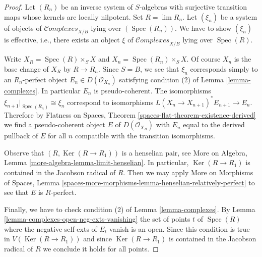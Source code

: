 \documentclass[10pt,a4paper]{amsart}
\theoremstyle{plain}
\theoremstyle{definition}
\theoremstyle{remark}
\numberwithin{equation}{subsection}
\def\lim{\mathop{\mathrm{lim}}\nolimits}
\def\Spec{\mathop{\mathrm{Spec}}}
\def\Ker{\mathop{\mathrm{Ker}}}
\def\Complexesstack{\mathcal{C}\!\mathit{omplexes}}
\begin{document}
\begin{proof}
Let $(R_n)$ be an inverse system of $S$-algebras with surjective transition
maps whose kernels are locally nilpotent. Set $R = \lim R_n$.
Let $(\xi_n)$ be a system of objects of $\Complexesstack_{X/B}$
lying over $(\Spec(R_n))$. We have to show $(\xi_n)$ is effective, i.e.,
there exists an object $\xi$ of $\Complexesstack_{X/B}$ lying over
$\Spec(R)$.

\medskip\noindent
Write $X_R = \Spec(R) \times_S X$ and $X_n = \Spec(R_n) \times_S X$.
Of course $X_n$ is the base change of $X_R$ by $R \to R_n$. Since $S = B$,
we see that $\xi_n$ corresponds simply to an $R_n$-perfect object
$E_n \in D(\mathcal{O}_{X_n})$ satisfying condition (2) of
Lemma \ref{lemma-complexes}. In particular $E_n$ is pseudo-coherent.
The isomorphisms $\xi_{n + 1}|_{\Spec(R_n)} \cong \xi_n$
correspond to isomorphisms $L(X_n \to X_{n + 1})^*E_{n + 1} \to E_n$.
Therefore by
Flatness on Spaces, Theorem \ref{spaces-flat-theorem-existence-derived}
we find a pseudo-coherent object $E$ of $D(\mathcal{O}_{X_R})$
with $E_n$ equal to the derived pullback of $E$ for all $n$
compatible with the transition isomorphisms.

\medskip\noindent
Observe that $(R, \Ker(R \to R_1))$ is a henselian pair, see
More on Algebra, Lemma \ref{more-algebra-lemma-limit-henselian}.
In particular, $\Ker(R \to R_1)$ is contained in the Jacobson radical of $R$.
Then we may apply More on Morphisms of Spaces, Lemma
\ref{spaces-more-morphisms-lemma-henselian-relatively-perfect}
to see that $E$ is $R$-perfect.

\medskip\noindent
Finally, we have to check condition (2) of Lemma \ref{lemma-complexes}.
By Lemma \ref{lemma-complexes-open-neg-exts-vanishing}
the set of points $t$ of $\Spec(R)$ where the negative self-exts of $E_t$
vanish is an open. Since this condition is true in $V(\Ker(R \to R_1))$
and since $\Ker(R \to R_1)$ is contained in the Jacobson radical of $R$
we conclude it holds for all points.
\end{proof}
\end{document}
